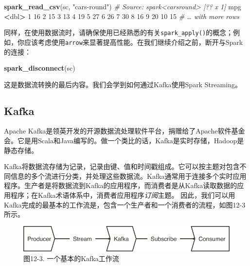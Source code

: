 \documentclass[
]{article}
\newenvironment{Shaded}{\begin{snugshade}}{\end{snugshade}}
\newcommand{\CommentTok}[1]{\textcolor[rgb]{0.56,0.35,0.01}{\textit{#1}}}
\newcommand{\DecValTok}[1]{\textcolor[rgb]{0.00,0.00,0.81}{#1}}
\newcommand{\KeywordTok}[1]{\textcolor[rgb]{0.13,0.29,0.53}{\textbf{#1}}}
\newcommand{\NormalTok}[1]{#1}
\newcommand{\OperatorTok}[1]{\textcolor[rgb]{0.81,0.36,0.00}{\textbf{#1}}}
\newcommand{\StringTok}[1]{\textcolor[rgb]{0.31,0.60,0.02}{#1}}
\begin{document}
\begin{Shaded}
\begin{Highlighting}[]
\KeywordTok{spark_read_csv}\NormalTok{(sc, }\StringTok{"cars-round"}\NormalTok{)}
\CommentTok{# Source: spark<carsround> [?? x 1]}
\NormalTok{ mpg}
 \OperatorTok{<}\NormalTok{dbl}\OperatorTok{>}
\StringTok{ }\DecValTok{1} \DecValTok{16}
 \DecValTok{2} \DecValTok{15}
 \DecValTok{3} \DecValTok{13}
 \DecValTok{4} \DecValTok{19}
 \DecValTok{5} \DecValTok{27}
 \DecValTok{6} \DecValTok{26}
 \DecValTok{7} \DecValTok{30}
 \DecValTok{8} \DecValTok{16}
 \DecValTok{9} \DecValTok{20}
\DecValTok{10} \DecValTok{15}
\CommentTok{# … with more rows}
\end{Highlighting}
\end{Shaded}

同样，在使用数据流时，请确保使用已经熟悉的有关\texttt{spark\_apply()}的概念；例如，你应该考虑使用\texttt{arrow}来显著提高性能。在我们继续介绍之前，断开与Spark的连接：

\begin{Shaded}
\begin{Highlighting}[]
\KeywordTok{spark_disconnect}\NormalTok{(sc)}
\end{Highlighting}
\end{Shaded}

这是数据流转换的最后内容。我们会学到如何通过Kafka使用Spark Streaming。

\hypertarget{kafka}{%
\subsection{Kafka}\label{kafka}}

Apache
Kafka是领英开发的开源数据流处理软件平台，捐赠给了Apache软件基金会。它是用Scala和Java编写的。做一个类比的话，Kafka是实时存储，Hadoop是静态存储。

Kafka将数据流存储为记录，记录由键、值和时间戳组成。它可以按主题对包含不同信息的多个流进行分类，并处理这些数据流。Kafka通常用于连接多个实时应用程序。生产者是将数据流到Kafka的应用程序，而消费者是从Kafka读取数据的应用程序；在Kafka术语体系中，消费者应用程序\emph{订阅}主题。
因此，我们可以用Kafka完成的最基本的工作流是，包含一个生产者和一个消费者的流程，如图12-3所示。

\begin{figure}
\centering
\includegraphics{figures/12_3.png}
\caption{图12-3. 一个基本的Kafka工作流}
\end{figure}
\end{document}
